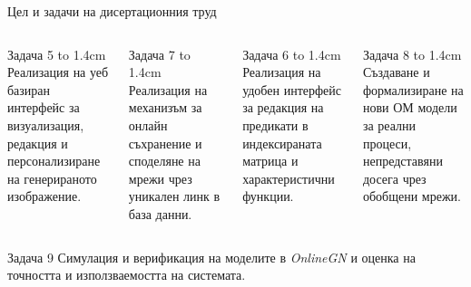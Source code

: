 \documentclass[aspectratio=169]{beamer}
\begin{document}
\begin{frame}{Цел и задачи на дисертационния труд}
  \vspace{-0.25cm}
  \begin{columns}[T]
      \begin{block}{Задача 5}
        \vbox to 1.4cm{
          \vspace{0.1cm}
          \small Реализация на уеб базиран интерфейс за визуализация, редакция и персонализиране на генерираното изображение.
          \vfil
        }
      \end{block}

      \begin{block}{Задача 7}
        \vbox to 1.4cm{
          \vspace{0.1cm}
          \small Реализация на механизъм за онлайн съхранение и споделяне на мрежи чрез уникален линк в база данни.
          \vfil
        }
      \end{block}

      \begin{block}{Задача 6}
        \vbox to 1.4cm{
          \vspace{0.1cm}
          \small Реализация на удобен интерфейс за редакция на предикати в индексираната матрица и характеристични функции.
          \vfil
        }
      \end{block}

      \begin{block}{Задача 8}
        \vbox to 1.4cm{
          \vspace{0.1cm}
          \small Създаване и формализиране на нови ОМ модели за реални процеси, непредставяни досега чрез обобщени мрежи.
          \vfil
        }
      \end{block}
  \end{columns}

  \vspace{0.2cm}

  \begin{block}{Задача 9}
    \centering
    \vspace{0.1cm}
    \small Симулация и верификация на моделите в \textit{OnlineGN} и оценка на точността и използваемостта на системата.
    \vspace{0.1cm}
  \end{block}
\end{frame}
\end{document}
